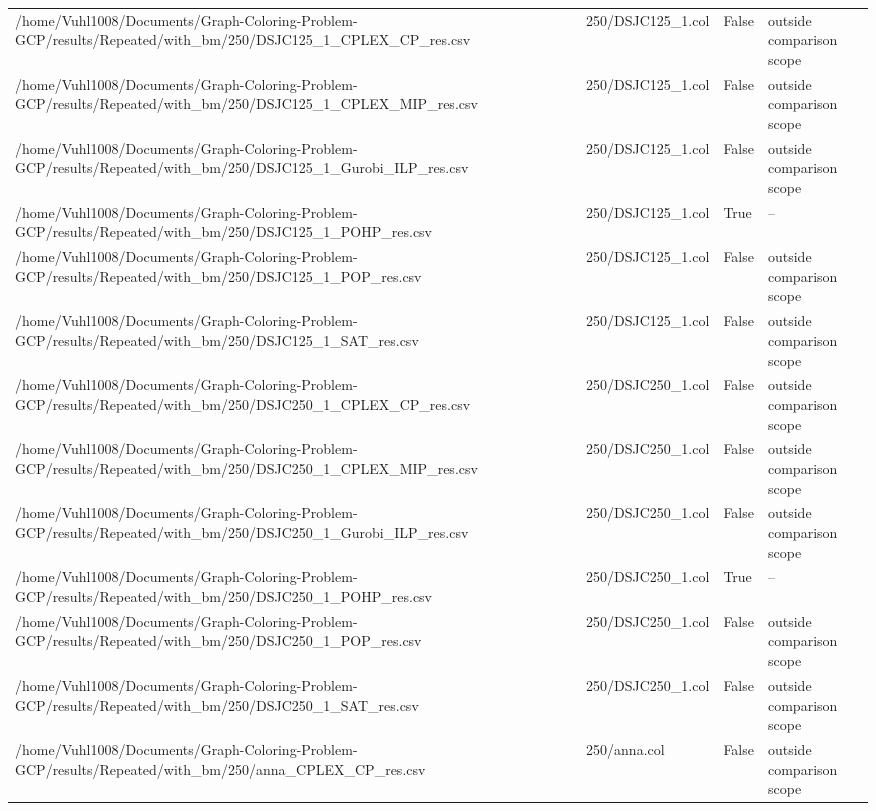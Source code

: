 \begin{table}[htbp]
\begin{tabular}{llll}
/home/Vuhl1008/Documents/Graph-Coloring-Problem-GCP/results/Repeated/with\_bm/250/DSJC125\_1\_CPLEX\_CP\_res.csv & 250/DSJC125\_1.col & False & outside comparison scope \\
/home/Vuhl1008/Documents/Graph-Coloring-Problem-GCP/results/Repeated/with\_bm/250/DSJC125\_1\_CPLEX\_MIP\_res.csv & 250/DSJC125\_1.col & False & outside comparison scope \\
/home/Vuhl1008/Documents/Graph-Coloring-Problem-GCP/results/Repeated/with\_bm/250/DSJC125\_1\_Gurobi\_ILP\_res.csv & 250/DSJC125\_1.col & False & outside comparison scope \\
/home/Vuhl1008/Documents/Graph-Coloring-Problem-GCP/results/Repeated/with\_bm/250/DSJC125\_1\_POHP\_res.csv & 250/DSJC125\_1.col & True & -- \\
/home/Vuhl1008/Documents/Graph-Coloring-Problem-GCP/results/Repeated/with\_bm/250/DSJC125\_1\_POP\_res.csv & 250/DSJC125\_1.col & False & outside comparison scope \\
/home/Vuhl1008/Documents/Graph-Coloring-Problem-GCP/results/Repeated/with\_bm/250/DSJC125\_1\_SAT\_res.csv & 250/DSJC125\_1.col & False & outside comparison scope \\
/home/Vuhl1008/Documents/Graph-Coloring-Problem-GCP/results/Repeated/with\_bm/250/DSJC250\_1\_CPLEX\_CP\_res.csv & 250/DSJC250\_1.col & False & outside comparison scope \\
/home/Vuhl1008/Documents/Graph-Coloring-Problem-GCP/results/Repeated/with\_bm/250/DSJC250\_1\_CPLEX\_MIP\_res.csv & 250/DSJC250\_1.col & False & outside comparison scope \\
/home/Vuhl1008/Documents/Graph-Coloring-Problem-GCP/results/Repeated/with\_bm/250/DSJC250\_1\_Gurobi\_ILP\_res.csv & 250/DSJC250\_1.col & False & outside comparison scope \\
/home/Vuhl1008/Documents/Graph-Coloring-Problem-GCP/results/Repeated/with\_bm/250/DSJC250\_1\_POHP\_res.csv & 250/DSJC250\_1.col & True & -- \\
/home/Vuhl1008/Documents/Graph-Coloring-Problem-GCP/results/Repeated/with\_bm/250/DSJC250\_1\_POP\_res.csv & 250/DSJC250\_1.col & False & outside comparison scope \\
/home/Vuhl1008/Documents/Graph-Coloring-Problem-GCP/results/Repeated/with\_bm/250/DSJC250\_1\_SAT\_res.csv & 250/DSJC250\_1.col & False & outside comparison scope \\
/home/Vuhl1008/Documents/Graph-Coloring-Problem-GCP/results/Repeated/with\_bm/250/anna\_CPLEX\_CP\_res.csv & 250/anna.col & False & outside comparison scope \\

\end{tabular}
\end{table}
